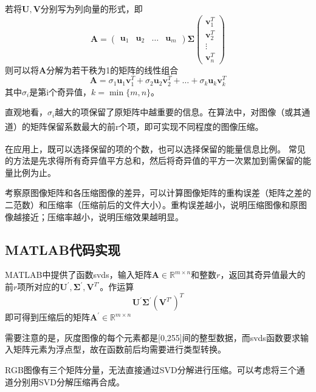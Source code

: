 \documentclass{article}
\newcommand{\upcite}[1]{\textsuperscript{\cite{#1}}}
\begin{document}
    若将\(\mathbf{U},\mathbf{V}\)分别写为列向量的形式，即
    \[\mathbf{A} = \begin{pmatrix}
                     \mathbf{u}_1 & \mathbf{u}_2 & \dots & \mathbf{u}_m 
                   \end{pmatrix} \mathbf{\Sigma} \begin{pmatrix}
                                                   \mathbf{v}_1^T \\
                                                   \mathbf{v}_2^T \\
                                                   \vdots \\
                                                   \mathbf{v}_n^T
                                                 \end{pmatrix}\]
    则可以将\(\mathbf{A}\)分解为若干秩为1的矩阵的线性组合
    \[\mathbf{A} = \sigma_1 \mathbf{u}_1\mathbf{v}_1^T + \sigma_2 \mathbf{u}_2\mathbf{v}_2^T + \dots + \sigma_k \mathbf{u}_k\mathbf{v}_k^T\]
    其中\(\sigma_i\)是第i个奇异值，\(k = \min\{m,n\}\)。
    
    直观地看，\(\sigma_i\)越大的项保留了原矩阵中越重要的信息。在算法中，对图像（或其通道）的矩阵保留系数最大的前r个项，即可实现不同程度的图像压缩。\upcite{Jimbo2023} 
    
    在应用上，既可以选择保留的项的个数，也可以选择保留的能量信息比例。\upcite{iGEO2022} 常见的方法是先求得所有奇异值平方总和，然后将奇异值的平方一次累加到需保留的能量比例为止。
    
    考察原图像矩阵和各压缩图像的差异，可以计算图像矩阵的重构误差（矩阵之差的二范数）和压缩率（压缩前后的文件大小）。重构误差越小，说明压缩图像和原图像越接近；压缩率越小，说明压缩效果越明显。
    
\subsection{MATLAB代码实现}
    MATLAB中提供了函数svds，输入矩阵\(\mathbf{A} \in \mathbb{R}^{m \times n}\)和整数\(r\)，返回其奇异值最大的前\(r\)项所对应的\(\mathbf{U}^{'},\mathbf{\Sigma}^{'},\mathbf{V}^{T'}\)。作运算
    \[\mathbf{U} ^{'}\mathbf{\Sigma}^{'}(\mathbf{V}^{T'})^{T}\]
    即可得到压缩后的矩阵\(\mathbf{A}^{'} \in \mathbb{R}^{m \times n}\)
    
    需要注意的是，灰度图像的每个元素都是[0,255]间的整型数据，而svds函数要求输入矩阵元素为浮点型，故在函数前后均需要进行类型转换。
    
    RGB图像有三个矩阵分量，无法直接通过SVD分解进行压缩。可以考虑将三个通道分别用SVD分解压缩再合成。
 
\end{document}
